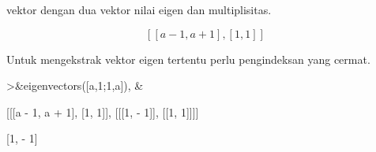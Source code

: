 \documentclass[a4paper,10pt]{article}
\begin{document}
\begin{eulernotebook}
\begin{eulercomment}
\begin{eulercomment}
\begin{eulercomment}
\begin{eulercomment}
\begin{eulercomment}
vektor dengan dua vektor nilai eigen dan multiplisitas.
\end{eulercomment}
\begin{eulerformula}
\[
\left[ \left[ a-1 , a+1 \right]  , \left[ 1 , 1 \right]  \right] 
\]
\end{eulerformula}
\begin{eulercomment}
Untuk mengekstrak vektor eigen tertentu perlu pengindeksan yang
cermat.
\end{eulercomment}
\begin{eulerprompt}
>&eigenvectors([a,1;1,a]), &%
\end{eulerprompt}
\begin{euleroutput}
  
            [[[a - 1, a + 1], [1, 1]], [[[1, - 1]], [[1, 1]]]]
  
  
                                 [1, - 1]
  

\end{euleroutput}
\end{eulercomment}
\end{eulercomment}
\end{eulercomment}
\end{eulercomment}
\end{eulernotebook}
\end{document}
